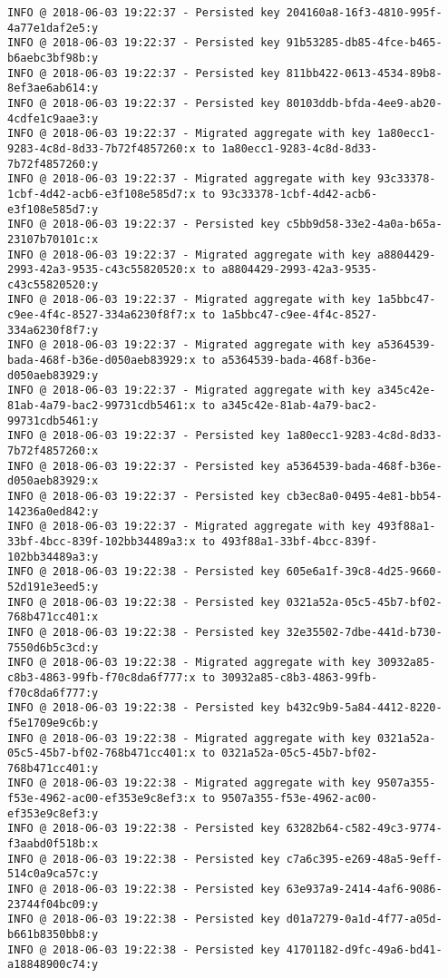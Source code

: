 \begin{lstlisting}[basicstyle=\footnotesize, label={testlog}, caption={De første 50 linjene i den applikasjonsloggen til tjeneren vbb\-master2018\-crabbe (se tabell \ref{droplets}) fra test 2.}]
INFO @ 2018-06-03 19:22:37 - Persisted key 204160a8-16f3-4810-995f-4a77e1daf2e5:y
INFO @ 2018-06-03 19:22:37 - Persisted key 91b53285-db85-4fce-b465-b6aebc3bf98b:y
INFO @ 2018-06-03 19:22:37 - Persisted key 811bb422-0613-4534-89b8-8ef3ae6ab614:y
INFO @ 2018-06-03 19:22:37 - Persisted key 80103ddb-bfda-4ee9-ab20-4cdfe1c9aae3:y
INFO @ 2018-06-03 19:22:37 - Migrated aggregate with key 1a80ecc1-9283-4c8d-8d33-7b72f4857260:x to 1a80ecc1-9283-4c8d-8d33-7b72f4857260:y
INFO @ 2018-06-03 19:22:37 - Migrated aggregate with key 93c33378-1cbf-4d42-acb6-e3f108e585d7:x to 93c33378-1cbf-4d42-acb6-e3f108e585d7:y
INFO @ 2018-06-03 19:22:37 - Persisted key c5bb9d58-33e2-4a0a-b65a-23107b70101c:x
INFO @ 2018-06-03 19:22:37 - Migrated aggregate with key a8804429-2993-42a3-9535-c43c55820520:x to a8804429-2993-42a3-9535-c43c55820520:y
INFO @ 2018-06-03 19:22:37 - Migrated aggregate with key 1a5bbc47-c9ee-4f4c-8527-334a6230f8f7:x to 1a5bbc47-c9ee-4f4c-8527-334a6230f8f7:y
INFO @ 2018-06-03 19:22:37 - Migrated aggregate with key a5364539-bada-468f-b36e-d050aeb83929:x to a5364539-bada-468f-b36e-d050aeb83929:y
INFO @ 2018-06-03 19:22:37 - Migrated aggregate with key a345c42e-81ab-4a79-bac2-99731cdb5461:x to a345c42e-81ab-4a79-bac2-99731cdb5461:y
INFO @ 2018-06-03 19:22:37 - Persisted key 1a80ecc1-9283-4c8d-8d33-7b72f4857260:x
INFO @ 2018-06-03 19:22:37 - Persisted key a5364539-bada-468f-b36e-d050aeb83929:x
INFO @ 2018-06-03 19:22:37 - Persisted key cb3ec8a0-0495-4e81-bb54-14236a0ed842:y
INFO @ 2018-06-03 19:22:37 - Migrated aggregate with key 493f88a1-33bf-4bcc-839f-102bb34489a3:x to 493f88a1-33bf-4bcc-839f-102bb34489a3:y
INFO @ 2018-06-03 19:22:38 - Persisted key 605e6a1f-39c8-4d25-9660-52d191e3eed5:y
INFO @ 2018-06-03 19:22:38 - Persisted key 0321a52a-05c5-45b7-bf02-768b471cc401:x
INFO @ 2018-06-03 19:22:38 - Persisted key 32e35502-7dbe-441d-b730-7550d6b5c3cd:y
INFO @ 2018-06-03 19:22:38 - Migrated aggregate with key 30932a85-c8b3-4863-99fb-f70c8da6f777:x to 30932a85-c8b3-4863-99fb-f70c8da6f777:y
INFO @ 2018-06-03 19:22:38 - Persisted key b432c9b9-5a84-4412-8220-f5e1709e9c6b:y
INFO @ 2018-06-03 19:22:38 - Migrated aggregate with key 0321a52a-05c5-45b7-bf02-768b471cc401:x to 0321a52a-05c5-45b7-bf02-768b471cc401:y
INFO @ 2018-06-03 19:22:38 - Migrated aggregate with key 9507a355-f53e-4962-ac00-ef353e9c8ef3:x to 9507a355-f53e-4962-ac00-ef353e9c8ef3:y
INFO @ 2018-06-03 19:22:38 - Persisted key 63282b64-c582-49c3-9774-f3aabd0f518b:x
INFO @ 2018-06-03 19:22:38 - Persisted key c7a6c395-e269-48a5-9eff-514c0a9ca57c:y
INFO @ 2018-06-03 19:22:38 - Persisted key 63e937a9-2414-4af6-9086-23744f04bc09:y
INFO @ 2018-06-03 19:22:38 - Persisted key d01a7279-0a1d-4f77-a05d-b661b8350bb8:y
INFO @ 2018-06-03 19:22:38 - Persisted key 41701182-d9fc-49a6-bd41-a18848900c74:y
\end{lstlisting}

